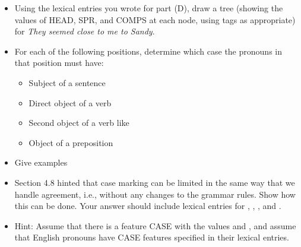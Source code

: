 \documentclass[a4paper,landscape,headrule,footrule]{foils}
\begin{document}
\begin{itemize}
   \begin{itemize}
   \item[(i)] 
   \item[(ii)] 
   \item[(iii)] 
   \item[(iv)] 
   \item[(v)] 
   \item[(vi)] 
   \item[(vii)] 
   \item[(viii)] 
   \end{itemize}

\newpage
\item[E.] Using the lexical entries you wrote for part (D), draw
a tree (showing the values of HEAD, SPR, and COMPS at each node,
using tags as appropriate) for {\it They seemed close to me to Sandy}.

\end{itemize}



\begin{itemize}
\item For each of the following positions,
determine which case the pronouns in that
position must have:
\begin{itemize}
\item Subject of a sentence
\item Direct object of a verb
\item Second object of a verb like 
\item Object of a preposition
\end{itemize}
\item Give examples
\end{itemize}

\begin{itemize}
\item Section 4.8 hinted that case marking can be
limited in the same way that we handle
agreement, i.e., without any changes to the
grammar rules. Show how this can be done.
Your answer should include lexical entries
for , , , and .
\item Hint: Assume that there is a feature CASE
with the values  and , and assume
that English pronouns have CASE features
specified in their lexical entries.
\end{itemize}
\end{document}
